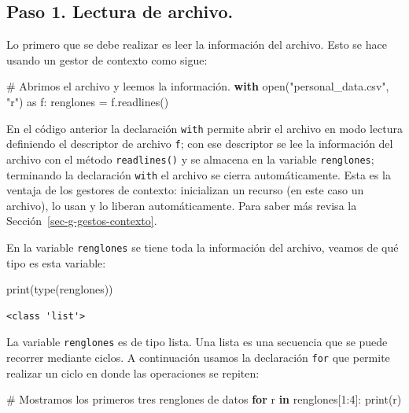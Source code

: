 \documentclass[
  spanish,
  letterpaper,
]{scrbook}
\newenvironment{Shaded}{\begin{snugshade}}{\end{snugshade}}
\newcommand{\BuiltInTok}[1]{\textcolor[rgb]{0.00,0.23,0.31}{#1}}
\newcommand{\CommentTok}[1]{\textcolor[rgb]{0.37,0.37,0.37}{#1}}
\newcommand{\ControlFlowTok}[1]{\textcolor[rgb]{0.00,0.23,0.31}{\textbf{#1}}}
\newcommand{\DecValTok}[1]{\textcolor[rgb]{0.68,0.00,0.00}{#1}}
\newcommand{\ImportTok}[1]{\textcolor[rgb]{0.00,0.46,0.62}{#1}}
\newcommand{\KeywordTok}[1]{\textcolor[rgb]{0.00,0.23,0.31}{\textbf{#1}}}
\newcommand{\NormalTok}[1]{\textcolor[rgb]{0.00,0.23,0.31}{#1}}
\newcommand{\OperatorTok}[1]{\textcolor[rgb]{0.37,0.37,0.37}{#1}}
\newcommand{\StringTok}[1]{\textcolor[rgb]{0.13,0.47,0.30}{#1}}
\theoremstyle{definition}
\theoremstyle{remark}
\begin{document}
\subsection{Paso 1. Lectura de
archivo.}\label{paso-1.-lectura-de-archivo.}

Lo primero que se debe realizar es leer la información del archivo. Esto
se hace usando un gestor de contexto como sigue:

\begin{Shaded}
\begin{Highlighting}[]
\CommentTok{\# Abrimos el archivo y leemos la información.}
\ControlFlowTok{with} \BuiltInTok{open}\NormalTok{(}\StringTok{"personal\_data.csv"}\NormalTok{, }\StringTok{"r"}\NormalTok{) }\ImportTok{as}\NormalTok{ f:}
\NormalTok{    renglones }\OperatorTok{=}\NormalTok{ f.readlines()}
\end{Highlighting}
\end{Shaded}

En el código anterior la declaración \texttt{with} permite abrir el
archivo en modo lectura definiendo el descriptor de archivo \texttt{f};
con ese descriptor se lee la información del archivo con el método
\texttt{readlines()} y se almacena en la variable \texttt{renglones};
terminando la declaración \texttt{with} el archivo se cierra
automáticamente. Esta es la ventaja de los gestores de contexto:
inicializan un recurso (en este caso un archivo), lo usan y lo liberan
automáticamente. Para saber más revisa la
Sección~\ref{sec-g-gestos-contexto}.

En la variable \texttt{renglones} se tiene toda la información del
archivo, veamos de qué tipo es esta variable:

\begin{Shaded}
\begin{Highlighting}[]
\BuiltInTok{print}\NormalTok{(}\BuiltInTok{type}\NormalTok{(renglones))}
\end{Highlighting}
\end{Shaded}

\begin{verbatim}
<class 'list'>
\end{verbatim}

La variable \texttt{renglones} es de tipo lista. Una lista es una
secuencia que se puede recorrer mediante ciclos. A continuación usamos
la declaración \texttt{for} que permite realizar un ciclo en donde las
operaciones se repiten:

\begin{Shaded}
\begin{Highlighting}[]
\CommentTok{\# Mostramos los primeros tres renglones de datos}
\ControlFlowTok{for}\NormalTok{ r }\KeywordTok{in}\NormalTok{ renglones[}\DecValTok{1}\NormalTok{:}\DecValTok{4}\NormalTok{]:}
    \BuiltInTok{print}\NormalTok{(r)}
\end{Highlighting}
\end{Shaded}
\end{document}

